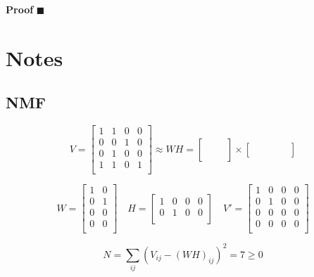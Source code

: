 \documentclass{extreport}
\begin{document}
\textbf{Proof}
$\blacksquare$

\section{Notes}

\subsection{NMF}

\[
  V =
  \begin{bmatrix}
    1 & 1 & 0 & 0 \\
    0 & 0 & 1 & 0 \\
    0 & 1 & 0 & 0 \\
    1 & 1 & 0 & 1 \\
  \end{bmatrix}
  \approx WH =
  \begin{bmatrix}
    & & \\
    & & \\
    & & \\
    & & \\
  \end{bmatrix}
  \times
  \begin{bmatrix}
    & & & & \\
    & & & & \\
  \end{bmatrix}
\]

\[
  W =
  \begin{bmatrix}
    1 & 0 \\
    0 & 1 \\
    0 & 0 \\
    0 & 0 \\
  \end{bmatrix} \quad
  H =
  \begin{bmatrix}
    1 & 0 & 0 & 0 \\
    0 & 1 & 0 & 0 \\
  \end{bmatrix} \quad
  V' =
  \begin{bmatrix}
    1 & 0 & 0 & 0 \\
    0 & 1 & 0 & 0 \\
    0 & 0 & 0 & 0 \\
    0 & 0 & 0 & 0 \\
  \end{bmatrix}
\]

\[
  N = \sum_{ij}
  \left(
    V_{ij} - (WH)_{ij}
  \right)^2
  = 7 \geqslant 0
\]
\end{document}
